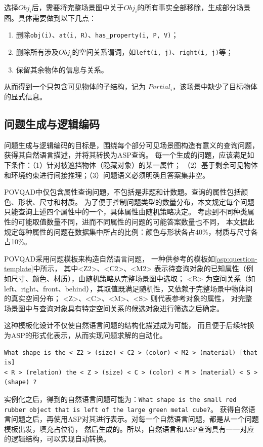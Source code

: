 选择$Obj_i$后，需要将完整场景图中关于$Obj_i$的所有事实全部移除，生成部分场景图。具体需要做到以下几点：
\begin{enumerate}[itemsep=0pt,parsep=0pt]
\item 删除\texttt{obj(i)}、\texttt{at(i, R)}、\texttt{has\_property(i, P, V)}；
\item 删除所有涉及$Obj_i$的空间关系谓词，如\texttt{left(i, j)}、\texttt{right(i, j)}等；
\item 保留其余物体的信息与关系。
\end{enumerate}
从而得到一个只包含可见物体的子结构，记为 $Partial_i$，该场景中缺少了目标物体的显式信息。
\subsection{问题生成与逻辑编码}
问题生成与逻辑编码的目标是，围绕每个部分可见场景图构造有意义的查询问题，获得其自然语言描述，并将其转换为ASP查询。
每一个生成的问题，应该满足如下条件：（1）针对被遮挡物体（隐藏对象）的某一属性；
（2）基于剩余可见物体和环境约束进行间接推理；（3）问题语义必须明确且答案集非空。

POVQAD中仅包含属性查询问题，不包括是非题和计数题。查询的属性包括颜色、形状、尺寸和材质。
为了便于控制问题类型的数量分布，本文规定每个问题只能查询上述四个属性中的一个，具体属性由随机策略决定。
考虑到不同种类属性的可能取值数量不同，进而不同属性的问题的可能答案数量也不同，
本文据此规定每种属性的问题在数据集中所占的比例：颜色与形状各占40\%，材质与尺寸各占10\%。

POVQAD采用问题模板来构造自然语言问题，
一种供参考的模板如\ref{asp:question-template}中所示，
其中<Z2>、<C2>、<M2> 表示待查询对象的已知属性（例如尺寸、颜色、材质），由随机策略从完整场景图中选取；
<R> 为空间关系（如left、right、front、behind），其取值既满足随机性，又依赖于完整场景中物体间的真实空间分布；
<Z>、<C>、<M>、<S> 则代表参考对象的属性，
对完整场景图中与查询对象具有特定空间关系的候选对象进行筛选之后确定。

这种模板化设计不仅使自然语言问题的结构化描述成为可能，
而且便于后续转换为ASP的形式化表示，从而实现问题求解的自动化。
\begin{lstlisting}[label=asp:question-template]
What shape is the < Z2 > (size) < C2 > (color) < M2 > (material) [that is] 
< R > (relation) the < Z > (size) < C > (color) < M > (material) < S > (shape) ?
\end{lstlisting}

实例化之后，得到的自然语言问题可能为：\texttt{What shape is the small red rubber object that is left of the large green metal cube?}。
获得自然语言问题之后，再使用ASP对其进行表示。对每一个自然语言问题，都是从一个问题模板出发，填充占位符，
然后生成的。所以，自然语言和ASP查询具有一一对应的逻辑结构，可以实现自动转换。

